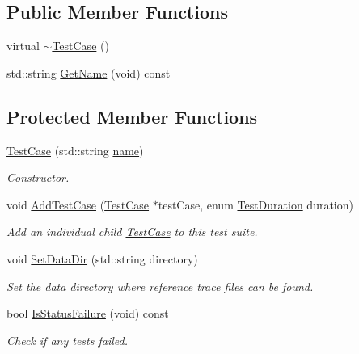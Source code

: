 \subsection*{Public Member Functions}
\begin{DoxyCompactItemize}
\item 
virtual \hyperlink{classns3_1_1TestCase_a7dff94a25826501614a2245e52427055}{$\sim$\+Test\+Case} ()
\item 
std\+::string \hyperlink{classns3_1_1TestCase_a28f7bb59669c24dae1c290fc17fc9b62}{Get\+Name} (void) const 
\end{DoxyCompactItemize}
\subsection*{Protected Member Functions}
\begin{DoxyCompactItemize}
\item 
\hyperlink{classns3_1_1TestCase_a3b0b91a96aac1933e8d146e019b9e207}{Test\+Case} (std\+::string \hyperlink{generate__test__data__lte__spectrum__model_8m_ab74e6bf80237ddc4109968cedc58c151}{name})
\begin{DoxyCompactList}\small\item\em Constructor. \end{DoxyCompactList}\item 
void \hyperlink{classns3_1_1TestCase_a3718088e3eefd5d6454569d2e0ddd835}{Add\+Test\+Case} (\hyperlink{classns3_1_1TestCase}{Test\+Case} $\ast$test\+Case, enum \hyperlink{classns3_1_1TestCase_a11f6f57c21a0d32e605d192a89550f91}{Test\+Duration} duration)
\begin{DoxyCompactList}\small\item\em Add an individual child \hyperlink{classns3_1_1TestCase}{Test\+Case} to this test suite. \end{DoxyCompactList}\item 
void \hyperlink{classns3_1_1TestCase_ab002fb0e5071fcde71a92ca9e8224b23}{Set\+Data\+Dir} (std\+::string directory)
\begin{DoxyCompactList}\small\item\em Set the data directory where reference trace files can be found. \end{DoxyCompactList}\item 
bool \hyperlink{classns3_1_1TestCase_a84802776ad3c5810765c720f13116ed6}{Is\+Status\+Failure} (void) const 
\begin{DoxyCompactList}\small\item\em Check if any tests failed. \end{DoxyCompactList}\item 

\end{DoxyCompactItemize}
